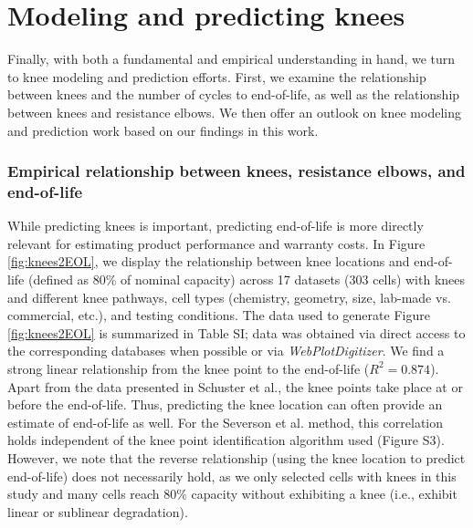 \documentclass[journal=jpclcd,manuscript=article]{achemso}
\newcommand{\ssri}[1]{{
\fbox{
\parbox{0.8\textwidth}{  \fbox{$\triangleright$\textcolor{blue}{\textbf{Shashank}:}} 
#1
}}}}
\newcommand{\pbox}[1]{{
\fbox{
\parbox{0.8\textwidth}{  \fbox{$\triangleright$\textcolor{blue}{\textbf{Peter}:}} 
#1
}}}}
\begin{document}
\section{Modeling and predicting knees}

Finally, with both a fundamental and empirical understanding in hand, we turn to knee modeling and prediction efforts.
First, we examine the relationship between knees and the number of cycles to end-of-life, as well as the relationship between knees and resistance elbows.
We then offer an outlook on knee modeling and prediction work based on our findings in this work.


\subsubsection{Empirical relationship between knees, resistance elbows, and end-of-life}

While predicting knees is important, predicting end-of-life is more directly relevant for estimating product performance and warranty costs. In Figure \ref{fig:knees2EOL}, we display the relationship between knee locations and end-of-life (defined as 80\% of nominal capacity) across 17 datasets (303 cells) with knees and different knee pathways, cell types (chemistry, geometry, size, lab-made vs. commercial, etc.), and testing conditions. The data used to generate Figure \ref{fig:knees2EOL} is summarized in Table SI; data was obtained via direct access to the corresponding databases when possible\cite{baumhofer_production_2014,diao_accelerated_2019,severson_data-driven_2019,willenberg_high-precision_2020,attia_closed-loop_2020} or via \textit{WebPlotDigitizer}\cite{Rohatgi2021}{}.
We find a strong linear relationship from the knee point to the end-of-life ($R^2=0.874$). Apart from the data presented in Schuster et al.\cite{schuster_nonlinear_2015}{}, the knee points take place at or before the end-of-life.
Thus, predicting the knee location can often provide an estimate of end-of-life as well.
For the Severson et al.\cite{severson_data-driven_2019} method, this correlation holds independent of the knee point identification algorithm used (Figure S3).
However, we note that the reverse relationship (using the knee location to predict end-of-life) does not necessarily hold, as we only selected cells with knees in this study and many cells reach 80\% capacity without exhibiting a knee (i.e., exhibit linear or sublinear degradation).
\end{document}
